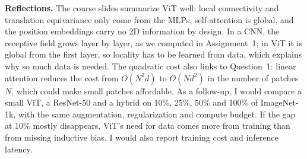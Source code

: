 \documentclass[12pt]{article}
\theoremstyle{definition}
\begin{document}
{\medskip
\textbf{Reflections.} The course slides summarize ViT well: local
connectivity and translation equivariance only come from the MLPs,
self-attention is global, and the position embeddings carry no 2D
information by design. In a CNN, the receptive field grows layer by layer,
as we computed in Assignment~1; in ViT it is global from the first layer,
so locality has to be learned from data, which explains why so much data
is needed. The quadratic cost also links to Question~1: linear attention
reduces the cost from $O(N^2d)$ to $O(Nd^2)$ in the number of patches $N$,
which could make small patches affordable. As a follow-up, I would compare
a small ViT, a ResNet-50 and a hybrid on 10\%, 25\%, 50\% and 100\% of
ImageNet-1k, with the same augmentation, regularization and compute budget.
If the gap at 10\% mostly disappears, ViT's need for data comes more from
training than from missing inductive bias. I would also report training
cost and inference latency.
}
\end{document}
